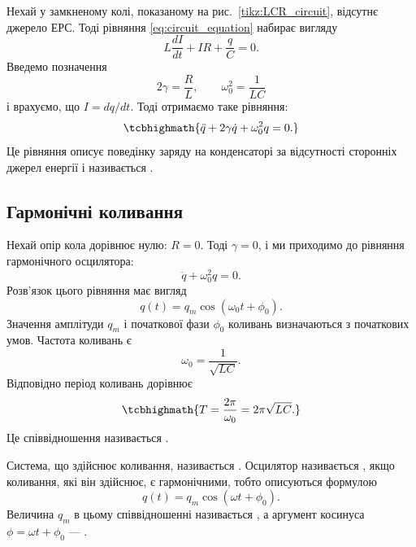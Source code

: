 Нехай у замкненому колі, показаному на рис.~\ref{tikz:LCR_circuit}, відсутнє
джерело ЕРС. Тоді рівняння \eqref{eq:circuit_equation} набирає вигляду
\begin{equation}\label{eq:free_oscillation_raw}
	L\frac{dI}{dt} + IR + \frac{q}{C} = 0.
\end{equation}
Введемо позначення
\begin{equation}\label{eq:definitions}
	2\gamma = \frac{R}{L}, \qquad \omega_0^2 = \frac{1}{LC}
\end{equation}
і врахуємо, що $I = dq/dt$. Тоді отримаємо таке рівняння:
\begin{equation}\label{eq:free_oscillation}
	\tcbhighmath{
		\ddot{q} + 2\gamma\dot{q} + \omega_0^2 q = 0.
	}
\end{equation}
Це рівняння описує поведінку заряду на конденсаторі за
відсутності сторонніх джерел енергії і називається .

\subsection*{Гармонічні коливання}

Нехай опір кола дорівнює нулю: $R = 0$. Тоді $\gamma = 0$, і ми
приходимо до рівняння гармонічного осцилятора:
\begin{equation}\label{eq:harmonic_equation}
	\ddot{q} + \omega_0^2 q = 0.
\end{equation}
Розв'язок цього рівняння має вигляд
\begin{equation}\label{eq:harmonic_solution}
	q(t) = q_m \cos(\omega_0 t + \phi_0).
\end{equation}
Значення амплітуди $q_m$ і початкової фази $\phi_0$ коливань визначаються
з початкових умов. Частота коливань є
\begin{equation}\label{eq:frequency}
	\omega_0 = \frac{1}{\sqrt{LC}}.
\end{equation}
Відповідно період коливань дорівнює
\begin{equation}\label{eq:Thomson_formula}
	\tcbhighmath{
		T = \frac{2\pi}{\omega_0} = 2\pi\sqrt{LC}.
	}
\end{equation}
Це співвідношення називається .

Система, що здійснює коливання, називається . Осцилятор називається
, якщо коливання, які він здійснює, є гармонічними, тобто описуються
формулою
\begin{equation}\label{eq:harmonic_general}
	q(t) = q_m \cos(\omega t + \phi_0).
\end{equation}
Величина $q_m$ в цьому співвідношенні називається , а аргумент
косинуса $\phi = \omega t + \phi_0$ --- .

